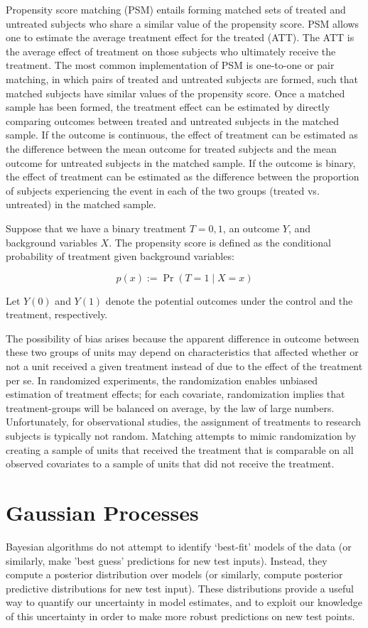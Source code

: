 \documentclass{article}
\begin{document}
Propensity score matching (PSM) entails forming matched sets of treated and
untreated subjects who share a similar value of the propensity
score. PSM allows one to estimate the average treatment effect for the
treated (ATT). The ATT is the average effect of treatment on those
subjects who ultimately receive the treatment. The most common
implementation of PSM is one-to-one or pair matching, in which pairs
of treated and untreated subjects are formed, such that matched
subjects have similar values of the propensity score. Once a matched
sample has been formed, the treatment effect can be estimated by
directly comparing outcomes between treated and untreated subjects in
the matched sample. If the outcome is continuous, the effect of
treatment can be estimated as the difference between the mean outcome
for treated subjects and the mean outcome for untreated subjects in
the matched sample. If the outcome is binary, the effect of treatment
can be estimated as the difference between the proportion of subjects
experiencing the event in each of the two groups (treated
vs. untreated) in the matched sample.

Suppose that we have a binary treatment $T={0,1}$, an outcome $Y$, and
background variables $X$. The propensity score is defined as the
conditional probability of treatment given background variables:

$$p(x):= \Pr(T=1 \mid X=x)$$

Let $Y(0)$ and $Y(1)$ denote the potential outcomes under the control
and the treatment, respectively.

The possibility of bias arises because the apparent difference in outcome between these two groups of units may depend on characteristics that affected whether or not a unit received a given treatment instead of due to the effect of the treatment per se. In randomized experiments, the randomization enables unbiased estimation of treatment effects; for each covariate, randomization implies that treatment-groups will be balanced on average, by the law of large numbers. Unfortunately, for observational studies, the assignment of treatments to research subjects is typically not random. Matching attempts to mimic randomization by creating a sample of units that received the treatment that is comparable on all observed covariates to a sample of units that did not receive the treatment.


\section{Gaussian Processes}
Bayesian algorithms do not attempt to identify ‘best-fit’ models of the data (or similarly, make 'best guess' predictions for new test inputs). Instead, they compute a posterior distribution over models (or similarly, compute posterior predictive distributions for new test input). These distributions provide a useful way to quantify our uncertainty in model estimates, and to exploit our knowledge of this uncertainty in order to make more robust predictions on new test points.
\end{document}
